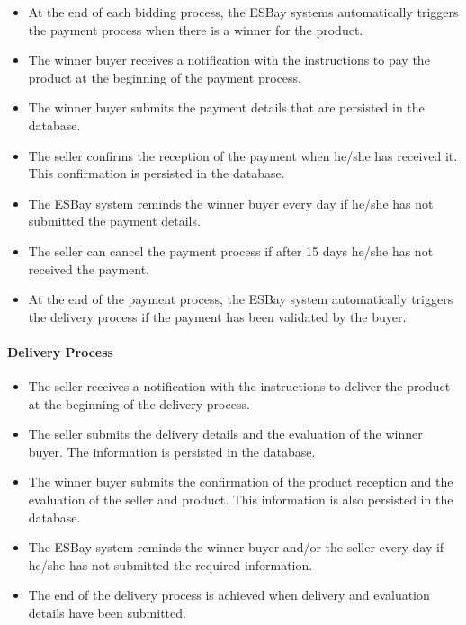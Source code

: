 \documentclass[12pt]{article}
\begin{document}
\begin{itemize}
  \item At the end of each bidding process, the ESBay systems automatically triggers the payment process when
        there is a winner for the product.
  \item The winner buyer receives a notification with the instructions to pay the product at the beginning of the
        payment process.
  \item The winner buyer submits the payment details that are persisted in the database.
  \item The seller confirms the reception of the payment when he/she has received it. This confirmation is
        persisted in the database.
  \item The ESBay system reminds the winner buyer every day if he/she has not submitted the payment details.
  \item The seller can cancel the payment process if after 15 days he/she has not received the payment.
  \item At the end of the payment process, the ESBay system automatically triggers the delivery process if the
        payment has been validated by the buyer.
\end{itemize}

\paragraph{Delivery Process}

\begin{itemize}
  \item The seller receives a notification with the instructions to deliver the product at the beginning of the delivery
        process.
  \item The seller submits the delivery details and the evaluation of the winner buyer. The information is persisted
        in the database.
  \item The winner buyer submits the confirmation of the product reception and the evaluation of the seller and
        product. This information is also persisted in the database.
  \item The ESBay system reminds the winner buyer and/or the seller every day if he/she has not submitted the
        required information.
  \item The end of the delivery process is achieved when delivery and evaluation details have been submitted.
\end{itemize}
\end{document}
